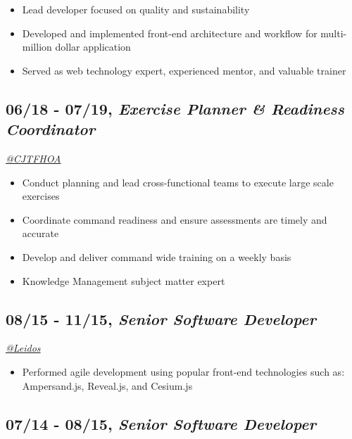 \documentclass[10pt]{article}
\def\tightlist{}
\begin{document}
\begin{itemize}
\tightlist
\item
  Lead developer focused on quality and sustainability
\item
  Developed and implemented front-end architecture and workflow for
  multi-million dollar application
\item
  Served as web technology expert, experienced mentor, and valuable
  trainer
\end{itemize}

\hypertarget{exercise-planner-readiness-coordinator}{%
\subsection{\texorpdfstring{06/18 - 07/19, \textbf{\emph{Exercise
Planner \& Readiness
Coordinator}}}{06/18 - 07/19, Exercise Planner \& Readiness Coordinator}}\label{exercise-planner-readiness-coordinator}}

\emph{\href{https://twitter.com/CJTFHOA}{@CJTFHOA}}

\begin{itemize}
\tightlist
\item
  Conduct planning and lead cross-functional teams to execute large
  scale exercises
\item
  Coordinate command readiness and ensure assessments are timely and
  accurate
\item
  Develop and deliver command wide training on a weekly basis
\item
  Knowledge Management subject matter expert
\end{itemize}

\hypertarget{senior-software-developer}{%
\subsection{\texorpdfstring{08/15 - 11/15, \textbf{\emph{Senior Software
Developer}}}{08/15 - 11/15, Senior Software Developer}}\label{senior-software-developer}}

\emph{\href{https://twitter.com/LeidosInc}{@Leidos}}

\begin{itemize}
\tightlist
\item
  Performed agile development using popular front-end technologies such
  as: Ampersand.js, Reveal.js, and Cesium.js
\end{itemize}

\hypertarget{senior-software-developer-1}{%
\subsection{\texorpdfstring{07/14 - 08/15, \textbf{\emph{Senior Software
Developer}}}{07/14 - 08/15, Senior Software Developer}}\label{senior-software-developer-1}}
\end{document}
